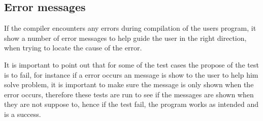 \subsection*{Error messages}
If the compiler encounters any errors during compilation of the users program, it show a number of error messages to help guide the user in the right direction, when trying to locate the cause of the error.

It is important to point out that for some of the test cases the propose of the test is to fail, for instance if a error occurs an message is show to the user to help him solve problem, it is important to make sure the message is only shown when the error occurs, therefore these tests are run to see if the messages are shown when they are not suppose to, hence if the test fail, the program works as intended and is a success.\\
